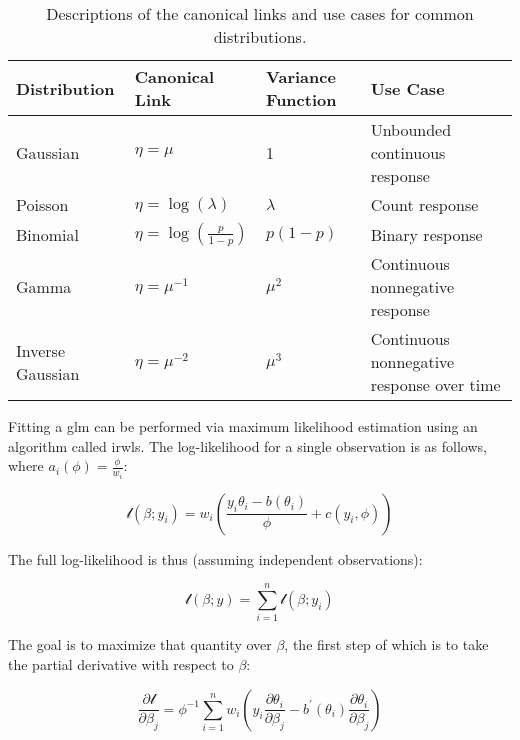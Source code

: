 \documentclass{report}
\begin{document}
\begin{table}[h!]
\centering
\begin{tabular}{||l l l l||} 
 \hline
 \textbf{Distribution} & \textbf{Canonical Link} & \textbf{Variance Function} & \textbf{Use Case} \\ [0.5ex] 
  \hline\hline
  Gaussian & $\eta = \mu$ & 1 & Unbounded continuous response \\ 
  \hline
  Poisson & $\eta = \log(\lambda)$ & $\lambda$ & Count response \\
  \hline
  Binomial & $\eta = \log\left(\frac{p}{1-p}\right)$ & $p(1-p)$ & Binary response \\
  \hline 
  Gamma & $\eta = \mu^{-1}$ & $\mu^2$ & Continuous nonnegative response \\
  \hline
  Inverse Gaussian & $\eta = \mu^{-2}$ & $\mu^3$ & Continuous nonnegative response over time \\ 
  \hline
\end{tabular}
\caption{Descriptions of the canonical links and use cases for common distributions.}
\label{table:links}
\end{table}

Fitting a \gls{glm} can be performed via maximum likelihood estimation using an algorithm called \gls{irwls}. The log-likelihood for a single observation is as follows, where $a_i(\phi) = \frac{\phi}{w_i}$:

\begin{equation}\label{eq:glm-loglik-individual}
    \mathcal{l}(\beta; y_i) = w_i \left(\frac{y_i\theta_i - b(\theta_i)}{\phi} + c(y_i, \phi)\right)
\end{equation}

The full log-likelihood is thus (assuming independent observations):

\begin{equation}\label{eq:glm-loglik-full}
    \mathcal{l}(\beta; y) = \sum_{i=1}^n \mathcal{l}(\beta; y_i)
\end{equation}

The goal is to maximize that quantity over $\beta$, the first step of which is to take the partial derivative with respect to $\beta$:

\begin{equation}\label{eq:glm-score-equation-1}
    \frac{\partial\mathcal{l}}{\partial\beta_j} = \phi^{-1} \sum_{i=1}^n w_i \left(y_i\frac{\partial\theta_i}{\partial\beta_j} - b^\prime(\theta_i)\frac{\partial\theta_i}{\partial\beta_j}\right)
\end{equation}
\end{document}
